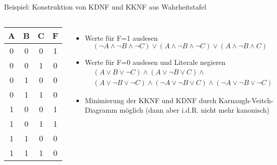 \begin{frame}{Beispiel: Konstruktion von KDNF und KKNF aus Wahrheitstafel}
	\begin{columns}
		\begin{center}
			\begin{tabular}{|c|c|c||c|}
				\hline
				A & B & C & F \\
				\hline
				0 & 0 & 0 & 1 \\
				0 & 0 & 1 & 0 \\
				0 & 1 & 0 & 0 \\
				0 & 1 & 1 & 0 \\
				1 & 0 & 0 & 1 \\
				1 & 0 & 1 & 1 \\
				1 & 1 & 0 & 0 \\
				1 & 1 & 1 & 0 \\
				\hline
			\end{tabular}
		\end{center}
		\begin{itemize}
			\item [KDNF:] Werte für F=1 auslesen
			$$(\neg A \land \neg B \land \neg C) \lor (A \land \neg B \land \neg C) \lor (A \land \neg B \land C)$$
			\item [KKNF:] Werte für F=0 auslesen und Literale negieren
			\begin{align*}
				&(A \lor B \lor \neg C) \land (A \lor \neg B \lor C) \land \\
				&(A \lor \neg B \lor \neg C) \land (\neg A \lor \neg B \lor C) \land (\neg A \lor \neg B \lor \neg C)
			\end{align*}
			\item Minimierung der KKNF und KDNF durch Karnaugh-Veitch-Diagramm möglich (dann aber i.d.R. nicht mehr kanonisch)
		\end{itemize}
	\end{columns}
\end{frame}

